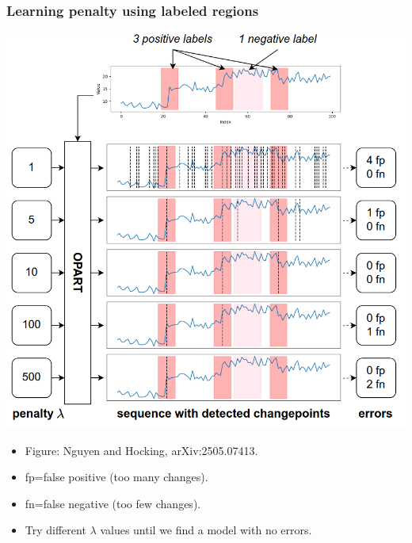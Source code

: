 \documentclass{beamer}
\begin{document}
\begin{frame}
  \frametitle{Learning penalty using labeled regions}
\parbox{0.6\textwidth}{
  \includegraphics[width=\linewidth]{supervised-change-label-error}
} \parbox{0.35\textwidth}{
  \begin{itemize}
  \item Figure: Nguyen and Hocking, arXiv:2505.07413.
  \item fp=false positive (too many changes).
  \item fn=false negative (too few changes).
  \item Try different $\lambda$ values until we find a model with no
    errors.
  \end{itemize}
 }
\end{frame}
\end{document}
